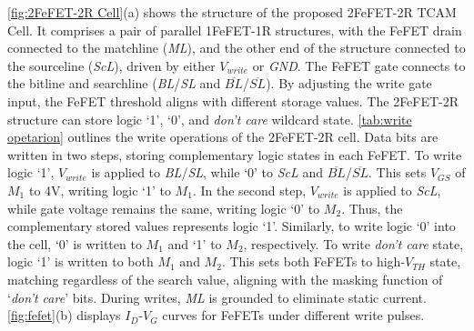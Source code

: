 

\autoref{fig:2FeFET-2R Cell}(a) shows the structure of the proposed 2FeFET-2R TCAM Cell. It comprises a pair of parallel  1FeFET-1R structures, with the FeFET drain connected to the matchline (\textit{ML}), and the other end of the structure connected to the sourceline (\textit{ScL}), driven by either $V_{\textit{write}}$ or \textit{GND}.
The FeFET gate connects to the bitline and searchline (\textit{BL}/\textit{SL} and $\overline{\textit{BL}}$/$\overline{\textit{SL}}$). 
By adjusting the write gate input, the FeFET threshold aligns with different storage values. 
The 2FeFET-2R structure can store logic `1', `0', and 
\textit{don't care} wildcard state.
\autoref{tab:write opetarion} outlines the write operations of the 2FeFET-2R cell. 
Data bits are written in two steps, storing complementary logic states in each FeFET. 
To write logic `1', $V_{\textit{write}}$ is applied to \textit{BL}/\textit{SL}, while `0' to \textit{ScL} and $\overline{\textit{BL}}$/$\overline{\textit{SL}}$. This sets $V_{\textit{GS}}$ of $\textit{M}_\text{1}$ to 4V, writing logic `1' to $\textit{M}_\text{1}$. In the second step, $V_{\textit{write}}$ is applied to \textit{ScL}, while gate voltage remains the same, writing logic `0' to $\textit{M}_\text{2}$. Thus, the complementary stored  values represents logic `1'.
Similarly, to write logic `0' into the cell, `0' is written to $\textit{M}_\text{1}$ and `1' to $\textit{M}_\text{2}$, respectively. 
To write \textit{don't care} state, logic `1' is written to both $\textit{M}_\text{1}$ and $\textit{M}_\text{2}$. This sets both FeFETs to high-$\textit{V}_\textit{TH}$ state, matching regardless of the search value, aligning with the masking function of `\textit{don't care}' bits.
During writes, \textit{ML} is grounded to eliminate static current. \autoref{fig:fefet}(b) displays $\textit{I}_\textit{D}$-$\textit{V}_\textit{G}$ curves for FeFETs under different write pulses.



